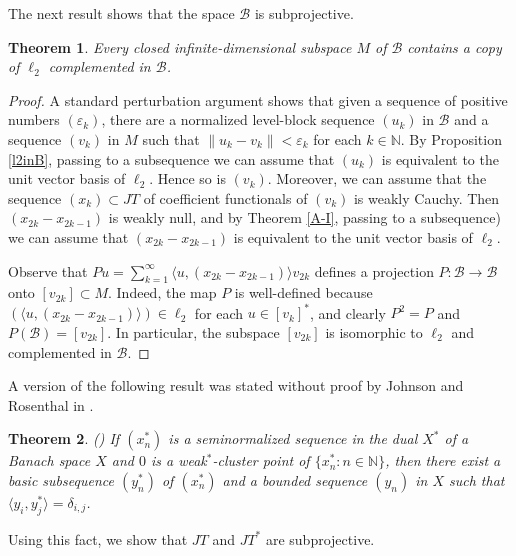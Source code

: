 \documentclass[12pt]{amsart}
\theoremstyle{plain}
\numberwithin{equation}{section}
\newcommand{\N}{\mathbb{N}}
\newcommand{\e}{\varepsilon}
\newcommand{\la}{\langle}
\newcommand{\ra}{\rangle}
\newcommand{\B}{\mathcal{B}}
\newtheorem{theorem}{Theorem}[section]
\begin{document}
The next result shows that the space $\B$ is subprojective.


\begin{theorem}\label{B-subp}
Every closed infinite-dimensional subspace $M$ of $\B$ contains a copy of $\ell_2$ complemented in $\B$.
\end{theorem}
\begin{proof}
A standard perturbation argument shows that given a sequence of positive numbers $(\e_k)$, there are a normalized level-block sequence $(u_k)$
in $\B$ and a sequence $(v_k)$ in $M$ such that $\|u_k-v_k\|<\e_k$ for each $k\in \N$. By Proposition \ref{l2inB}, passing to a subsequence
we can assume that $(u_k)$ is equivalent to the unit vector basis of $\ell_2$. Hence so is $(v_k)$.
Moreover, we can assume that the sequence $(x_k)\subset JT$ of coefficient functionals of $(v_k)$ is weakly Cauchy.
Then $(x_{2k}- x_{2k-1})$ is weakly null, and by Theorem \ref{A-I}, passing to a subsequence) we can assume that $(x_{2k}- x_{2k-1})$
is equivalent to the unit vector basis of $\ell_2$.

Observe that $Pu = \sum_{k=1}^\infty \langle u,(x_{2k}- x_{2k-1})\rangle v_{2k}$ defines a projection $P:\B\to\B$ onto $[v_{2k}]\subset M$.
Indeed, the map $P$ is well-defined because $(\langle u,(x_{2k}- x_{2k-1})\rangle)\in\ell_2$ for each $u\in [v_k]^*$,
and clearly $P^2=P$ and $P(\B)=[v_{2k}]$.
In particular, the subspace $[v_{2k}]$ is isomorphic to $\ell_2$ and complemented in $\B$.
\end{proof}



A version of the following result was stated without proof by Johnson and Rosenthal in \cite[Remark III.1]{J-R}.

\begin{theorem}\label{G-MA} \emph{(\cite[Theorem 1]{G-MA})}
If $(x_n^*)$ is a seminormalized sequence in the dual $X^*$ of a Banach space $X$ and $0$ is a weak$^*$-cluster point of $\{x^*_n : n \in \N\}$,
then there exist a basic subsequence $(y^*_n)$ of $(x^*_n)$ and a bounded sequence $(y_n)$ in $X$ such that $\la y_i, y^*_j\ra = \delta_{i,j}$.
\end{theorem}

Using this fact, we show that $JT$ and $JT^*$ are subprojective.
\end{document}
